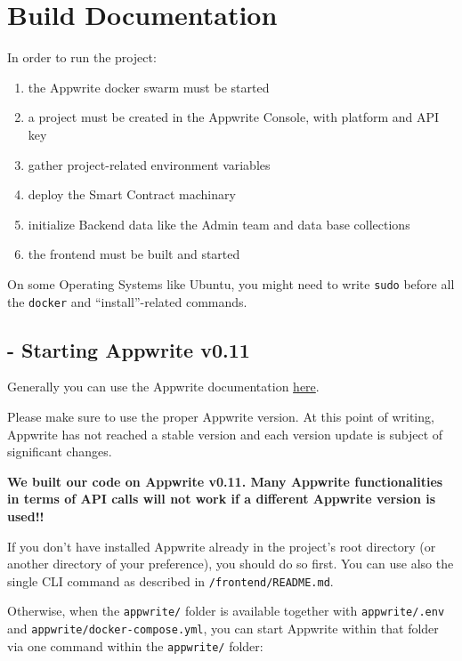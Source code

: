 \documentclass[
]{article}
\date{}
\providecommand{\tightlist}{%
  \setlength{\itemsep}{0pt}\setlength{\parskip}{0pt}}
\begin{document}
\hypertarget{build-documentation}{%
\section{Build Documentation}\label{build-documentation}}

In order to run the project:

\begin{enumerate}
\def\labelenumi{\arabic{enumi}.}
\tightlist
\item
  the Appwrite docker swarm must be started
\item
  a project must be created in the Appwrite Console, with platform and
  API key
\item
  gather project-related environment variables
\item
  deploy the Smart Contract machinary
\item
  initialize Backend data like the Admin team and data base collections
\item
  the frontend must be built and started
\end{enumerate}

On some Operating Systems like Ubuntu, you might need to write
\texttt{sudo} before all the \texttt{docker} and ``install''-related
commands.

\hypertarget{starting-appwrite-v0.11}{%
\subsection{- Starting Appwrite v0.11}\label{starting-appwrite-v0.11}}

Generally you can use the Appwrite documentation
\href{https://appwrite.io/docs/installation}{here}.

Please make sure to use the proper Appwrite version. At this point of
writing, Appwrite has not reached a stable version and each version
update is subject of significant changes.

\textbf{We built our code on Appwrite v0.11. Many Appwrite
functionalities in terms of API calls will not work if a different
Appwrite version is used!!}

If you don't have installed Appwrite already in the project's root
directory (or another directory of your preference), you should do so
first. You can use also the single CLI command as described in
\texttt{/frontend/README.md}.

Otherwise, when the \texttt{appwrite/} folder is available together with
\texttt{appwrite/.env} and \texttt{appwrite/docker-compose.yml}, you can
start Appwrite within that folder via one command within the
\texttt{appwrite/} folder:
\end{document}
